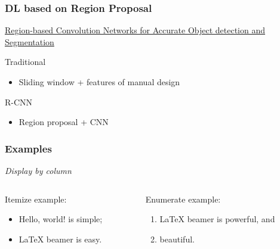\documentclass{beamer}
\begin{document}
\begin{frame}
  \frametitle{DL based on Region Proposal}
  \href{https://people.eecs.berkeley.edu/~rbg/papers/pami/rcnn_pami.pdf}
  {Region-based Convolution Networks for Accurate Object detection and Segmentation}
  \begin{block}{Traditional}
    \begin{itemize}
    \item Sliding window + features of manual design 
    \end{itemize}
  \end{block}
  \begin{block}{R-CNN}
    \begin{itemize}
    \item Region proposal + CNN
    \end{itemize}
  \end{block}
\end{frame}


\begin{frame}\frametitle{Examples}
  \emph{Display by column}
  \begin{columns}
    \begin{column}{.5\textwidth}
      \begin{example}
        Itemize example:
        \begin{itemize}
        \item Hello, world! is simple;
        \item \LaTeX{} beamer is easy.
        \end{itemize}
      \end{example}
    \end{column}
    \begin{column}{.5\textwidth}
      \begin{exampleblock}{Enumerate example:}
        \begin{enumerate}
        \item \LaTeX{} beamer is powerful, and
        \item beautiful.
        \end{enumerate}
      \end{exampleblock}
    \end{column}
  \end{columns}
\end{frame}
\end{document}
